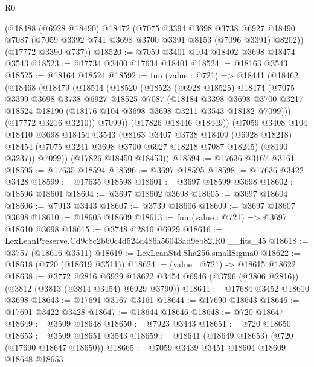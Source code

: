 \begin{lexlean}{R0}
\begin{coremodule}
    (@18488
      (@6928 @18490)
      @18472
      (@7075
        @3394
        @3698
        @3738
        @6927
        @18490
        @7087
        (@7059 @3392 @741 @3698 @3700 @3391 @8153 (@7096 @3391) @8202))
      (@17772 @3390 @737))
@18520 := @7059 @3401 @104 @18402 @3698 @18474 @3543
@18523 := @17734 @3400 @17634 @18401
@18524 := @18163 @3543
@18525 := @18164 @18524
@18592 := fun (value : @721) =>
  @18441
    (@18462
      (@18468
        (@18479
          (@18514
            (@18520
              (@18523
                (@6928 @18525)
                @18474
                (@7075
                  @3399
                  @3698
                  @3738
                  @6927
                  @18525
                  @7087
                  (@18184
                    @3398
                    @3698
                    @3700
                    @3217
                    @18524
                    @18190
                    (@18176 @104 @3698 @3698 @3211 @3543 @18182 @7099)))
                (@17772 @3216 @3210))
              @7099))
          (@17826 @18446 @18449))
        (@7059
          @3408
          @104
          @18410
          @3698
          @18454
          @3543
          (@8163
            @3407
            @3738
            @18409
            (@6928 @18218)
            @18454
            (@7075 @3241 @3698 @3700 @6927 @18218 @7087 @18245)
            (@8190 @3237))
          @7099))
      (@17826 @18450 @18453))
@18594 := @17636 @3167 @3161
@18595 := @17635 @18594
@18596 := @3697 @18595
@18598 := @17636 @3422 @3428
@18599 := @17635 @18598
@18601 := @3697 @18599 @3698
@18602 := @18596 @18601
@18604 := @3697 @18602 @3698
@18605 := @3697 @18604
@18606 := @7913 @3443
@18607 := @3739 @18606
@18609 := @3697 @18607 @3698
@18610 := @18605 @18609
@18613 := fun (value : @721) => @3697 @18610 @3698
@18615 := @3748 @2816 @6929
@18616 := LexLeanPreserve.Cd9c8c2b60c4d524d486a56043ad9eb82.R0.__fits_45
@18618 := @3757 (@18616 @3511)
@18619 := LexLeanStd.Sha256.smallSigma0
@18622 := @18618 (@720 (@18619 @3511))
@18624 := (value : @721) -> @18615 @18622
@18638 := @3772
    @2816
    @6929
    @18622
    @3454
    @6946
    (@3796 (@3806 @2816))
    (@3812 (@3813 (@3814 @3454) @6929 @3790))
@18641 := @17684 @3452 @18610 @3698
@18643 := @17691 @3167 @3161
@18644 := @17690 @18643
@18646 := @17691 @3422 @3428
@18647 := @18644 @18646
@18648 := @720 @18647
@18649 := @3509 @18648
@18650 := @7923 @3443
@18651 := @720 @18650
@18653 := @3509 @18651 @3543
@18659 := @18641 (@18649 @18653) (@720 (@17690 @18647 @18650))
@18665 := @7059 @3439 @3451 @18604 @18609 @18648 @18653

\end{coremodule}
\end{lexlean}

